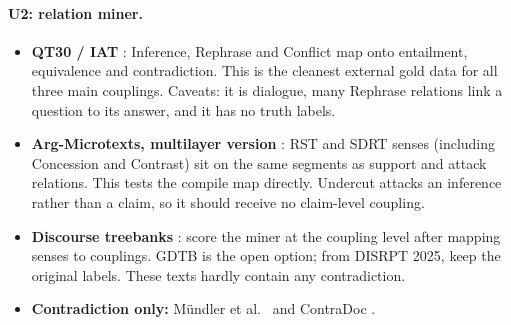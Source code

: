 \documentclass[10pt]{article}
\newcommand{\sense}[1]{\textsf{#1}}
\begin{document}
\paragraph{U2: relation miner.}
\begin{itemize}
\item \textbf{QT30 / IAT} \citep{qt30,us2016}: Inference, Rephrase and Conflict map onto entailment,
  equivalence and contradiction. This is the cleanest external gold data for all three main
  couplings. Caveats: it is dialogue, many Rephrase relations link a question to its answer, and it
  has no truth labels.
\item \textbf{Arg-Microtexts, multilayer version} \citep{microtexts,microtexts2}: RST and SDRT senses
  (including \sense{Concession} and \sense{Contrast}) sit on the same segments as support and attack
  relations. This tests the compile map directly. Undercut attacks an inference rather than a claim,
  so it should receive no claim-level coupling.
\item \textbf{Discourse treebanks} \citep{pdtb,rstdt,gum}: score the miner at the coupling level
  after mapping senses to couplings. GDTB is the open option; from DISRPT 2025, keep the original
  labels. These texts hardly contain any contradiction.
\item \textbf{Contradiction only:} Mündler et al.\ \citep{mundler2024} and ContraDoc
  \citep{contradoc}.
\end{itemize}
\end{document}
